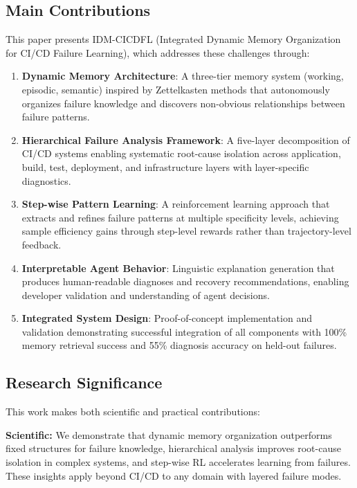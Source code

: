 \documentclass[11pt]{article}
\begin{document}
\subsection{Main Contributions}

This paper presents IDM-CICDFL (Integrated Dynamic Memory Organization for CI/CD Failure Learning), which addresses these challenges through:

\begin{enumerate}
    \item \textbf{Dynamic Memory Architecture}: A three-tier memory system (working, episodic, semantic) inspired by Zettelkasten methods that autonomously organizes failure knowledge and discovers non-obvious relationships between failure patterns.
    
    \item \textbf{Hierarchical Failure Analysis Framework}: A five-layer decomposition of CI/CD systems enabling systematic root-cause isolation across application, build, test, deployment, and infrastructure layers with layer-specific diagnostics.
    
    \item \textbf{Step-wise Pattern Learning}: A reinforcement learning approach that extracts and refines failure patterns at multiple specificity levels, achieving sample efficiency gains through step-level rewards rather than trajectory-level feedback.
    
    \item \textbf{Interpretable Agent Behavior}: Linguistic explanation generation that produces human-readable diagnoses and recovery recommendations, enabling developer validation and understanding of agent decisions.
    
    \item \textbf{Integrated System Design}: Proof-of-concept implementation and validation demonstrating successful integration of all components with 100\% memory retrieval success and 55\% diagnosis accuracy on held-out failures.
\end{enumerate}

\subsection{Research Significance}

This work makes both scientific and practical contributions:

\textbf{Scientific:} We demonstrate that dynamic memory organization outperforms fixed structures for failure knowledge, hierarchical analysis improves root-cause isolation in complex systems, and step-wise RL accelerates learning from failures. These insights apply beyond CI/CD to any domain with layered failure modes.
\end{document}
